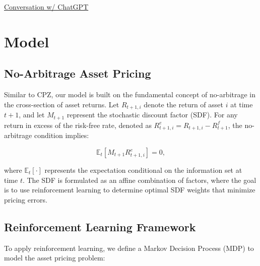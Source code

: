 {\centering \href{https://chatgpt.com/share/6705ce5e-3bb4-800d-b77e-fc6fb7837572}{Conversation w/ ChatGPT} \par}

%


\section{Model}
\subsection{No-Arbitrage Asset Pricing}
Similar to CPZ, our model is built on the fundamental concept of no-arbitrage in the cross-section of asset returns. Let $R_{t+1, i}$ denote the return of asset $i$ at time $t+1$, and let $M_{t+1}$ represent the stochastic discount factor (SDF). For any return in excess of the risk-free rate, denoted as $R_{t+1, i}^e = R_{t+1, i} - R_{t+1}^f$, the no-arbitrage condition implies:

\begin{equation}
    \mathbb{E}_t\left[M_{t+1} R_{t+1, i}^e\right] = 0,
\end{equation}

where $\mathbb{E}_t[\cdot]$ represents the expectation conditional on the information set at time $t$. The SDF is formulated as an affine combination of factors, where the goal is to use reinforcement learning to determine optimal SDF weights that minimize pricing errors.

\subsection{Reinforcement Learning Framework}
To apply reinforcement learning, we define a Markov Decision Process (MDP) to model the asset pricing problem:

